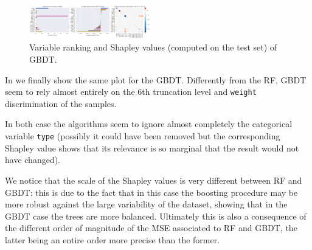 \begin{figure}[htbp]
  \centering
  \includegraphics[width=0.475\textwidth]{img/grd_bst_shapley}
  \caption{Variable ranking and Shapley values (computed on the test set) of
  GBDT.}
  \label{fig:ml:grd_bst_shap}
\end{figure}

In  we finally show the same plot for the GBDT.
Differently from the RF, GBDT seem to rely almost entirely on the 6th
truncation level and \texttt{weight} discrimination of the samples.

In both case the algorithms seem to ignore almost completely the categorical
variable \texttt{type} (possibly it could have been removed but the
corresponding Shapley value shows that its relevance is so marginal that the
result would not have changed).

We notice that the scale of the Shapley values is very different between RF and
GBDT: this is due to the fact that in this case the boosting procedure may be
more robust against the large variability of the dataset, showing that in the
GBDT case the trees are more balanced.
Ultimately this is also a consequence of the different order of magnitude of
the MSE associated to RF and GBDT, the latter being an entire order more
precise than the former.
